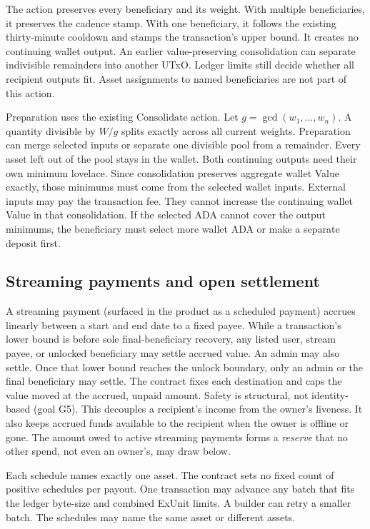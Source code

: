 \documentclass[11pt,DIV=11,parskip=half-]{scrartcl}
\begin{document}
The action preserves every beneficiary and its weight. With multiple beneficiaries, it preserves the cadence stamp. With one beneficiary, it follows the existing thirty-minute cooldown and stamps the transaction's upper bound. It creates no continuing wallet output. An earlier value-preserving consolidation can separate indivisible remainders into another UTxO. Ledger limits still decide whether all recipient outputs fit. Asset assignments to named beneficiaries are not part of this action.

Preparation uses the existing $\mathrm{Consolidate}$ action. Let $g=\gcd(w_1,\ldots,w_n)$. A quantity divisible by $W/g$ splits exactly across all current weights. Preparation can merge selected inputs or separate one divisible pool from a remainder. Every asset left out of the pool stays in the wallet. Both continuing outputs need their own minimum lovelace. Since consolidation preserves aggregate wallet Value exactly, those minimums must come from the selected wallet inputs. External inputs may pay the transaction fee. They cannot increase the continuing wallet Value in that consolidation. If the selected ADA cannot cover the output minimums, the beneficiary must select more wallet ADA or make a separate deposit first.


\subsection{Streaming payments and open settlement}
A streaming payment (surfaced in the product as a scheduled payment) accrues linearly between a start and end date to a fixed payee. While a transaction's lower bound is before sole final-beneficiary recovery, any listed user, stream payee, or unlocked beneficiary may settle accrued value. An admin may also settle. Once that lower bound reaches the unlock boundary, only an admin or the final beneficiary may settle. The contract fixes each destination and caps the value moved at the accrued, unpaid amount. Safety is structural, not identity-based (goal G5). This decouples a recipient's income from the owner's liveness. It also keeps accrued funds available to the recipient when the owner is offline or gone. The amount owed to active streaming payments forms a \emph{reserve} that no other spend, not even an owner's, may draw below.

Each schedule names exactly one asset. The contract sets no fixed count of positive schedules per payout. One transaction may advance any batch that fits the ledger byte-size and combined ExUnit limits. A builder can retry a smaller batch. The schedules may name the same asset or different assets.
\end{document}
